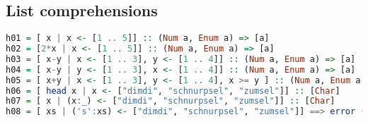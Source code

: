 \hypertarget{list-comprehensions}{%
\subsection{List comprehensions}\label{list-comprehensions}}

\begin{lstlisting}[language=Haskell]
h01 = [ x | x <- [1 .. 5]] :: (Num a, Enum a) => [a]
h02 = [2*x | x <- [1 .. 5]] :: (Num a, Enum a) => [a]
h03 = [ x-y | x <- [1 .. 3], y <- [1 .. 4]] :: (Num a, Enum a) => [a]
h04 = [ x-y | y <- [1 .. 3], x <- [1 .. 4]] :: (Num a, Enum a) => [a]
h05 = [ x+y | x <- [1 .. 3], y <- [1 .. 4], x >= y ] :: (Num a, Enum a, Ord a) => [a]
h06 = [ head x | x <- ["dimdi", "schnurpsel", "zumsel"]] :: [Char]
h07 = [ x | (x:_) <- ["dimdi", "schnurpsel", "zumsel"]] :: [Char]
h08 = [ xs | ('s':xs) <- ["dimdi", "schnurpsel", "zumsel"]] ==> error (s unkown)
\end{lstlisting}

\clearpage